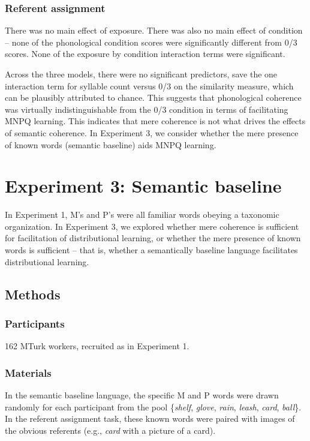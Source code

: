 \documentclass[man,floatsintext]{apa6}
\begin{document}
\subsubsection{Referent assignment}
There was no main effect of exposure. There was also no main effect of condition -- none of the phonological condition scores were significantly different from 0/3 scores. None of the exposure by condition interaction terms were significant.

Across the three models, there were no significant predictors, save the one interaction term for syllable count versus 0/3 on the similarity measure, which can be plausibly attributed to chance. This suggests that phonological coherence was virtually indistinguishable from the 0/3 condition in terms of facilitating MNPQ learning. This indicates that mere coherence is not what drives the effects of semantic coherence. In Experiment 3, we consider whether the mere presence of known words (semantic baseline) aids MNPQ learning.

\section{Experiment 3: Semantic baseline}

In Experiment 1, M's and P's were all familiar words obeying a taxonomic organization. In Experiment 3, we explored whether mere coherence is sufficient for facilitation of distributional learning, or whether the mere presence of known words is sufficient -- that is, whether a semantically baseline language facilitates distributional learning.

\subsection{Methods}
\subsubsection{Participants}
162 MTurk workers, recruited as in Experiment 1.

\subsubsection{Materials}
In the semantic baseline language, the specific M and P words were drawn randomly for each participant from the pool \{\emph{shelf}, \emph{glove}, \emph{rain}, \emph{leash}, \emph{card}, \emph{ball}\}. In the referent assignment task, these known words were paired with images of the obvious referents (e.g., \emph{card} with a picture of a card).
\end{document}
